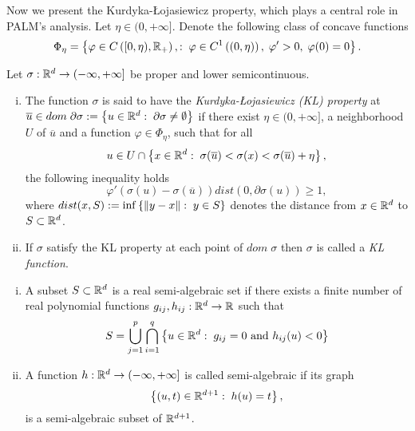 Now we present the Kurdyka-{\L}ojasiewicz property, which plays a central role in PALM's analysis. Let $\eta \in (0,+\infty]$. Denote the following class of concave functions
\begin{equation*}
	\Phi_{\eta} = \left\lbrace \varphi \in C\left([0,\eta), \mathbb{R}_+ \right)  , : \; \varphi \in C^1\left((0,\eta)\right), \; \varphi'>0, \; \varphi(0)=0 \right\rbrace .
\end{equation*}

\begin{definition}
	Let $\sigma: \mathbb{R}^d \rightarrow (-\infty,+\infty]$ be proper and lower semicontinuous.
	\begin{enumerate}[(i)]
		\item The function $\sigma$ is said to have the \textit{Kurdyka-{\L}ojasiewicz (KL) property} at $\overline{u} \in dom \; \partial\sigma :=  \left\lbrace u \in \mathbb{R}^d : \; \partial\sigma \neq \emptyset \right\rbrace$ if there exist $\eta \in (0,+\infty]$, a neighborhood $U$ of $\overline{u}$ and a function $\varphi \in \Phi_{\eta}$, such that for all
		\begin{equation*}
			u \in U \cap \left\lbrace x \in \mathbb{R}^d : \; \sigma(\overline{u}) < \sigma(x) < \sigma(\overline{u}) + \eta \right\rbrace,
		\end{equation*}
		the following inequality holds
		\begin{equation*}
			\varphi'(\sigma(u) - \sigma(\overline{u}))dist(0,\partial\sigma(u)) \geq 1,
		\end{equation*}
		where $dist(x,S) := \inf \left\lbrace \left\Vert {y-x} \right\Vert : \; y \in S\right\rbrace$ denotes the distance from $x \in \mathbb{R}^d$ to $S \subset \mathbb{R}^d$.
		\item If $\sigma$ satisfy the KL property at each point of $dom\;\sigma$ then $\sigma$ is called a \textit{KL function}.
	\end{enumerate}
\end{definition}

\begin{definition} 
\begin{enumerate}[(i)]
	\item A subset $S \subset \mathbb{R}^d$ is a real semi-algebraic set if there exists a finite number of real polynomial functions $g_{ij}, h_{ij}: \mathbb{R}^d \rightarrow \mathbb{R}$ such that
	\begin{equation*}
		S = \bigcup\limits_{j=1}^{p} \bigcap\limits_{i=1}^{q} \left\lbrace u \in \mathbb{R}^d : \; g_{ij}=0 \text{ and } h_{ij}(u)<0 \right\rbrace
	\end{equation*}
	\item A function $h:\mathbb{R}^d \rightarrow (-\infty, +\infty]$ is called semi-algebraic if its graph
	\begin{equation*}
		\left\lbrace (u,t)\in\mathbb{R}^{d+1} : \; h(u)=t \right\rbrace ,
	\end{equation*}
	is a semi-algebraic subset of $\mathbb{R}^{d+1}$.
\end{enumerate}
\end{definition}

